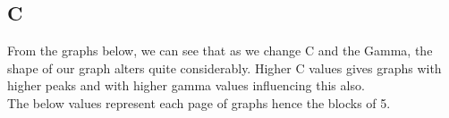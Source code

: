 \documentclass[11pt]{article} %
\begin{document}
\subsection{C}
From the graphs below, we can see that as we change C and the Gamma, the shape of our graph alters quite considerably. Higher C values gives graphs with higher peaks and with higher gamma values influencing this also. 
\\ The below values represent each page of graphs hence the blocks of 5.

\begin{figure}[h]
\centering
{}
\qquad
{}
\qquad
{}

\end{figure}
\end{document}
